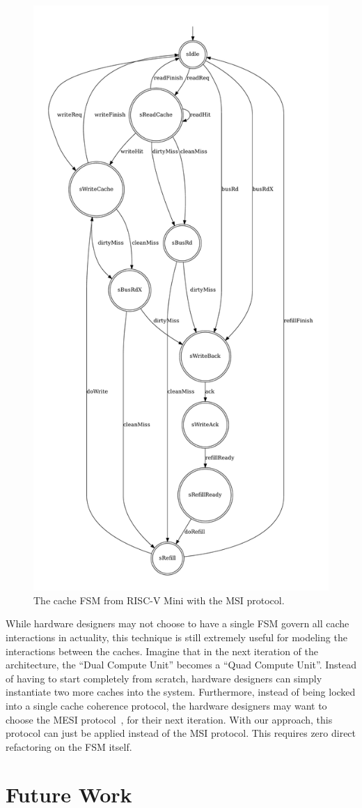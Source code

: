 \documentclass[sigplan,anonymous,review]{acmart}
\begin{document}
\begin{figure}
    \centering
    \includegraphics[width=0.7\linewidth]{figures/cacheFSM2.pdf}
    \caption{The cache FSM from RISC-V Mini with the MSI protocol.}
    \label{fig:cacheAfter}
\end{figure}

While hardware designers may not choose to have a single FSM govern all cache interactions in actuality, this technique is still extremely useful for modeling the interactions between the caches. Imagine that in the next iteration of the architecture, the ``Dual Compute Unit'' becomes a ``Quad Compute Unit''. Instead of having to start completely from scratch, hardware designers can simply instantiate two more caches into the system. Furthermore, instead of being locked into a single cache coherence protocol, the hardware designers may want to choose the MESI protocol~\cite{}, for their next iteration. With our approach, this protocol can just be applied instead of the MSI protocol. This requires zero direct refactoring on the FSM itself.

\section{Future Work}



\end{document}
